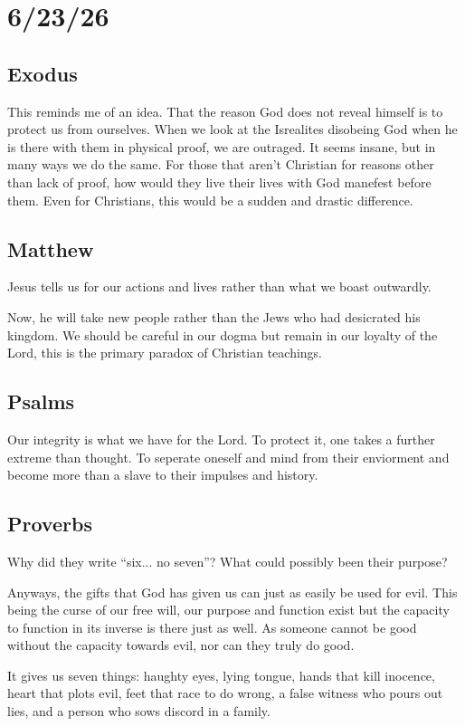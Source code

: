 \section{6/23/26}
\subsection{Exodus}
This reminds me of an idea. That the reason God does not reveal himself is to protect us from ourselves. When we look at the Isrealites disobeing God when he is there with them in physical proof, we are outraged. It seems insane, but in many ways we do the same. For those that aren't Christian for reasons other than lack of proof, how would they live their lives with God manefest before them. Even for Christians, this would be a sudden and drastic difference.

\subsection{Matthew}

Jesus tells us for our actions and lives rather than what we boast outwardly.

Now, he will take new people rather than the Jews who had desicrated his kingdom. We should be careful in our dogma but remain in our loyalty of the Lord, this is the primary paradox of Christian teachings.

\subsection{Psalms}
Our integrity is what we have for the Lord. To protect it, one takes a further extreme than thought. To seperate oneself and mind from their enviorment and become more than a slave to their impulses and history.

\subsection{Proverbs}

Why did they write ``six... no seven''? What could possibly been their purpose?

Anyways, the gifts that God has given us can just as easily be used for evil. This being the curse of our free will, our purpose and function exist but the capacity to function in its inverse is there just as well. As someone cannot be good without the capacity towards evil, nor can they truly do good.

It gives us seven things: haughty eyes, lying tongue, hands that kill inocence, heart that plots evil, feet that race to do wrong, a false witness who pours out lies, and a person who sows discord in a family.

